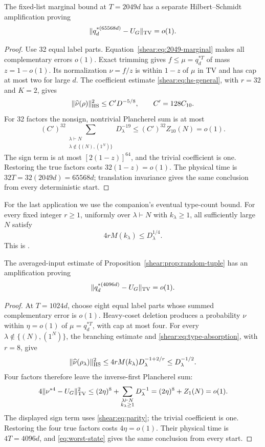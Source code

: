 \begin{theorem}
\label{shear:thm:32-block}
The fixed-list marginal bound at \(T=2049d\) has a separate
Hilbert--Schmidt amplification proving
\[
 \|q_d^{*(65568d)}-U_G\|_{\mathrm{TV}}=o(1).
\]
\end{theorem}
\begin{proof}
Use 32 equal label parts. Equation~\eqref{shear:eq:2049-marginal}
makes all complementary errors \(o(1)\). Exact trimming gives
\(f\le\mu=q_d^{*T}\) of mass \(z=1-o(1)\). Its normalization
\(\nu=f/z\) is within \(1-z\) of \(\mu\) in TV and has cap at most
two for large \(d\). The coefficient estimate
\eqref{shear:eq:hs-general}, with \(r=32\) and \(K=2\), gives
\[
 \|\widehat\nu(\rho)\|_{\mathrm{HS}}^2
 \le C'D^{-5/8},\qquad C'=128C_{10}.
\]
For 32 factors the nonsign, nontrivial Plancherel sum is at most
\[
 (C')^{32}\sum_{\substack{\lambda\vdash N\\
                           \lambda\notin\{(N),(1^N)\}}}D_\lambda^{-19}
 \le(C')^{32}Z_{10}(N)=o(1).
\]
The sign term is at most \([2(1-z)]^{64}\), and the trivial coefficient
is one. Restoring the true factors costs \(32(1-z)=o(1)\).
The physical time is \(32T=32(2049d)=65568d\); translation invariance
gives the same conclusion from every deterministic start.
\end{proof}

For the last application we use the companion's eventual type-count
bound. For every fixed integer \(r\ge1\), uniformly over
\(\lambda\vdash N\) with \(k_\lambda\ge1\), all sufficiently large \(N\)
satisfy
\begin{equation}
 4rM(k_\lambda)\le D_\lambda^{1/4}.
 \label{shear:eq:type-absorption}
\end{equation}
This is \cite[Lemma~]{partial-fourier}.

\begin{theorem}
\label{shear:thm:4096}
The averaged-input estimate of Proposition~\ref{shear:prop:random-tuple}
has an amplification proving
\[
 \|q_d^{*(4096d)}-U_G\|_{\mathrm{TV}}=o(1).
\]
\end{theorem}
\begin{proof}
At \(T=1024d\), choose eight equal label parts whose summed complementary
error is \(o(1)\). Heavy-coset deletion produces a probability \(\nu\)
within \(\eta=o(1)\) of \(\mu=q_d^{*T}\), with cap at most four.
For every \(\lambda\notin\{(N),(1^N)\}\), the branching estimate and
\eqref{shear:eq:type-absorption}, with \(r=8\), give
\[
 \|\widehat\nu(\rho_\lambda)\|_{\mathrm{HS}}^2
 \le4rM(k_\lambda)D_\lambda^{-1+2/r}
 \le D_\lambda^{-1/2}.
\]
Four factors therefore leave the inverse-first Plancherel sum:
\[
 4\|\nu^{*4}-U_G\|_{\mathrm{TV}}^2
 \le(2\eta)^8+
       \sum_{\substack{\lambda\vdash N\\k_\lambda\ge1}}D_\lambda^{-1}
 =(2\eta)^8+Z_1(N)=o(1).
\]
The displayed sign term uses \eqref{shear:eq:parity}; the trivial
coefficient is one. Restoring the four true factors costs \(4\eta=o(1)\).
Their physical time is \(4T=4096d\), and \eqref{eq:worst-state}
gives the same conclusion from every start.
\end{proof}

